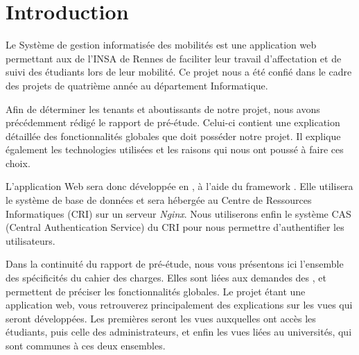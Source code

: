 \chapter*{Introduction}

Le Système de gestion informatisée des mobilités est une application web permettant aux \ris de l'INSA de Rennes de faciliter leur travail d'affectation et de suivi des étudiants lors de leur mobilité. Ce projet nous a été confié dans le cadre des projets de quatrième année au département Informatique.

\bigbreak

Afin de déterminer les tenants et aboutissants de notre projet, nous avons précédemment rédigé le rapport de pré-étude. Celui-ci contient une explication détaillée des fonctionnalités globales que doit posséder notre projet. Il explique également les technologies utilisées et les raisons qui nous ont poussé à faire ces choix. 

L'application Web sera donc développée en \php, à l'aide du framework \symfony. Elle utilisera le système de base de données \mdb et sera hébergée au Centre de Ressources Informatiques (CRI) sur un serveur \textit{Nginx}. Nous utiliserons enfin le système CAS (Central Authentication Service) du CRI pour nous permettre d'authentifier les utilisateurs.

\bigbreak

Dans la continuité du rapport de pré-étude, nous vous présentons ici l'ensemble des spécificités du cahier des charges. Elles sont liées aux demandes des \ris, et permettent de préciser les fonctionnalités globales. Le projet étant une application web, vous retrouverez principalement des explications sur les vues qui seront développées. Les premières seront les vues auxquelles ont accès les étudiants, puis celle des administrateurs, et enfin les vues liées au universités, qui sont communes à ces deux ensembles.